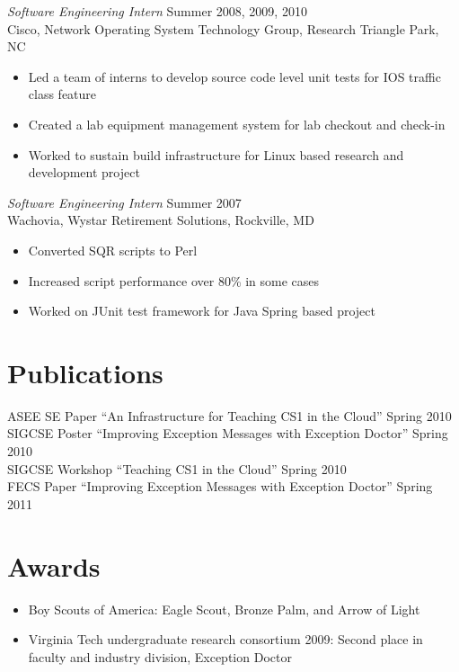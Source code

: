 \documentclass[line,margin]{res}
\begin{document}
\begin{resume}
        {\sl Software Engineering Intern} \hfill  Summer 2008, 2009, 2010 \\
           Cisco, Network Operating System Technology Group, Research Triangle Park, NC
              \begin{itemize}  \itemsep -2pt %
                   \item Led a team of interns to develop source code level unit
                     tests for IOS traffic class feature
                   \item Created a lab equipment management system for lab checkout and check-in
                   \item Worked to sustain build infrastructure for Linux
                     based research and development project
              \end{itemize}
        {\sl Software Engineering Intern} \hfill  Summer 2007 \\
           Wachovia, Wystar Retirement Solutions, Rockville, MD
              \begin{itemize}  \itemsep -2pt %
                   \item Converted SQR scripts to Perl
                   \item Increased script performance over 80\% in some cases
                   \item Worked on JUnit test framework for Java Spring based project
              \end{itemize} 

\section{Publications}
ASEE SE Paper ``An Infrastructure for Teaching CS1 in the Cloud'' Spring 2010 \\
SIGCSE Poster ``Improving Exception Messages with Exception Doctor'' Spring 2010 \\
SIGCSE Workshop ``Teaching CS1 in the Cloud'' Spring 2010 \\
FECS Paper ``Improving Exception Messages with Exception Doctor'' Spring 2011

\section{Awards}
\begin{itemize}  \itemsep -2pt %
\item Boy Scouts of America: Eagle Scout, Bronze Palm, and Arrow of Light
\item Virginia Tech undergraduate research consortium 2009:  Second place in faculty and industry division, Exception Doctor
\end{itemize}
\end{resume}
\end{document}

